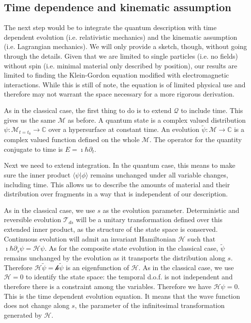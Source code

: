 \documentclass[smallextended]{svjour3}
\numberwithin{equation}{section}
\theoremstyle{definition}
\begin{document}
\subsection{Time dependence and kinematic assumption}

The next step would be to integrate the quantum description with time dependent evolution (i.e. relativistic mechanics) and the kinematic assumption (i.e. Lagrangian mechanics). We will only provide a sketch, though, without going through the details. Given that we are limited to single particles (i.e. no fields) without spin (i.e. minimal material only described by position), our results are limited to finding the Klein-Gordon equation modified with electromagnetic interactions. While this is still of note, the equation is of limited physical use and therefore may not warrant the space necessary for a more rigorous derivation.

As in the classical case, the first thing to do is to extend $\mathcal{Q}$ to include time. This gives us the same $\mathcal{M}$ as before. A quantum state is a complex valued distribution $\psi : \mathcal{M}_{t=t_0} \rightarrow \mathbb{C}$ over a hypersurface at constant time. An evolution $\widetilde{\psi} : \mathcal{M} \rightarrow \mathbb{C}$ is a complex valued function defined on the whole $\mathcal{M}$. The operator for the quantity conjugate to time is $E=\imath\hbar\partial_t$.

Next we need to extend integration. In the quantum case, this means to make sure the inner product $\langle \psi | \phi \rangle$ remains unchanged under all variable changes, including time. This allows us to describe the amounts of material and their distribution over fragments in a way that is independent of our description.

As in the classical case, we use $s$ as the evolution parameter. Deterministic and reversible evolution $\mathcal{T}_{ds}$ will be a unitary transformation defined over this extended inner product, as the structure of the state space is conserved. Continuous evolution will admit an invariant Hamiltonian $\mathcal{H}$ such that $\imath \hbar \partial_s \psi = \mathcal{H} \psi$. As for the composite state evolution in the classical case, $\widetilde{\psi}$ remains unchanged by the evolution as it transports the distribution along $s$. Therefore $\mathcal{H} \widetilde{\psi} = \mathcal{h} \widetilde{\psi}$ is an eigenfunction of $\mathcal{H}$. As in the classical case, we use $\mathcal{H}=0$ to identify the state space: the temporal d.o.f. is not independent and therefore there is a constraint among the variables. Therefore we have $\mathcal{H} \psi = 0$. This is the time dependent evolution equation. It means that the wave function does not change along $s$, the parameter of the infinitesimal transformation generated by $\mathcal{H}$.
\end{document}
